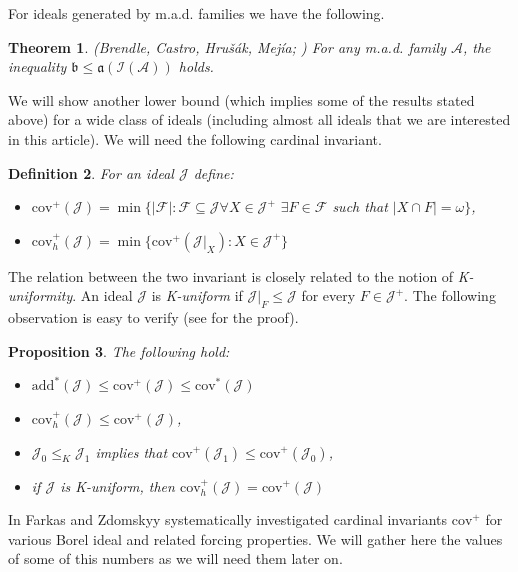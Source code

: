 \documentclass[a4paper]{amsart}
\newtheorem{theorem}{Theorem}[section]
\newtheorem{proposition}[theorem]{Proposition}
\newtheorem{definition}[theorem]{Definition}
\newcommand{\aaa}{\mathfrak{a}}
\newcommand{\bbb}{\mathfrak{b}}
\newcommand{\add}{\mathrm{add}}
\newcommand{\cov}{\mathrm{cov}}
\newcommand{\J}{\mathcal{J}}
\begin{document}
For ideals generated by m.a.d. families we have the following.
\begin{theorem}(Brendle, Castro, Hrušák, Mejía; \cite{BrendleCastro})
    For any m.a.d. family $\mathcal{A}$, the inequality $\bbb\leq\aaa(\mathcal{I}(\mathcal{A}))$ holds.
\end{theorem}
We will show another lower bound (which implies some of the results stated above) for a wide class of ideals (including almost all ideals that we are interested in this article). We will need the following cardinal invariant.
\begin{definition}\label{defOfCovPlus}
For an ideal $\J$ define:
\begin{itemize}
        \item[--] $\cov^{+}(\J)=\min\{|\mathcal{F}|:\mathcal{F}\subseteq\J \forall X\in\J^{+}$ $\exists F\in\mathcal{F}$ such that $|X\cap F|=\omega\}$,
        \item[--] $\cov^{+}_{h}(\J)=\min\{\cov^{+}(\J|_{X}):X\in\J^{+}\}$
\end{itemize}
\end{definition}
The relation between the two invariant is closely related to the notion of \emph{K-uniformity}. An ideal $\J$ is \emph{K-uniform} if $\J|_{F}\leq\J$ for every $F\in\J^{+}$. 
The following observation is easy to verify (see \cite{FarkasZdomskyy} for the proof).
\begin{proposition}
    The following hold:
    \begin{itemize}
        \item[--] $\add^{*}(\J)\leq \cov^{+}(\J)\leq\cov^{*}(\J)$
        \item[--] $\cov^{+}_{h}(\J)\leq \cov^{+}(\J)$,
        \item[--] $\J_{0}\leq_{K}\J_{1}$ implies that $\cov^{+}(\J_{1})\leq\cov^{+}(\J_{0})$,
        \item[--] if $\J$ is K-uniform, then $\cov^{+}_{h}(\J)=\cov^{+}(\J)$
    \end{itemize}
\end{proposition}
In \cite{FarkasZdomskyy} Farkas and Zdomskyy systematically investigated cardinal invariants $\cov^{+}$ for various Borel ideal and related forcing properties. We will gather here the values of some of this numbers as we will need them later on.
\end{document}
